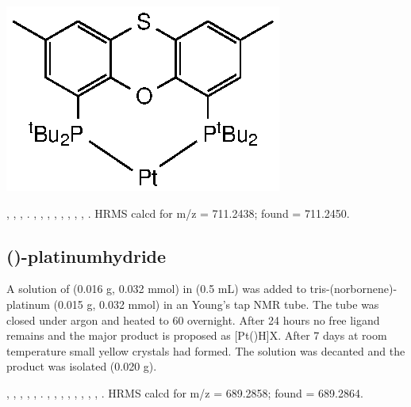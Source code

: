 \begin{structure}[h]
\begin{center}
\includegraphics{../Structures/StBuPlatinum.eps}
\end{center}
\end{structure}

,
,
,
.
,
,
,
,
,
,
,
,
.
HRMS calcd for  m/z = 711.2438; found = 711.2450.

\subsection*{(\tBuXantphosk)-platinumhydride}

A solution of \tBuxantphos{} (0.016 g, 0.032 mmol) in  (0.5 mL) was added to tris-(norbornene)-platinum (0.015 g, 0.032 mmol) in an Young's tap NMR tube.  The tube was closed under argon and heated to 60 \degC{} overnight.  After 24 hours no free ligand remains and the major product is proposed as [Pt(\tBuxantphosk)H]X.  After 7 days at room temperature small yellow crystals had formed.  The solution was decanted and the product was isolated (0.020 g).  

,
,
,
,
,
.
,
,
,
,
,
,
,
,
.
HRMS calcd for  m/z = 689.2858; found = 689.2864.

